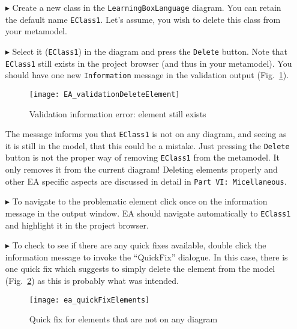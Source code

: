 \begin{enumerate}
\item[$\blacktriangleright$] Create a new class in the \texttt{Learning\-Box\-Language} diagram.
You can retain the default name \texttt{EClass1}.
Let's assume, you wish to delete this class from your metamodel.

\item[$\blacktriangleright$] Select it (\texttt{EClass1}) in the diagram and press the \texttt{Delete} button.
Note that \texttt{EClass1} still exists in the project browser (and thus in your metamodel). You should have one new \texttt{Information} message in the validation output (Fig.~\ref{fig:validation_information}).

\begin{figure}[htbp]
	\centering
  \texttt{[image: EA\_validationDeleteElement]}
	\caption{Validation information error: element still exists}
	\label{fig:validation_information}
\end{figure}

\pagebreak

The message informs you that \texttt{EClass1} is not on any diagram, and seeing as it is still in the model, that this could be a mistake.
Just pressing the \texttt{Delete} button is not the proper way of removing \texttt{EClass1} from the metamodel. It only removes it from the current diagram!
Deleting elements properly and other EA specific aspects are discussed in detail in \texttt{Part VI: Micellaneous}.


\item[$\blacktriangleright$] To navigate to the problematic element click once on the information message in the output window.
EA should navigate automatically to \texttt{EClass1} and highlight it in the project browser.

\item[$\blacktriangleright$] To check to see if there are any quick fixes available, double click the information message to invoke the ``QuickFix'' dialogue.
In this case, there is one quick fix which suggests to simply delete the element from the model (Fig.~\ref{fig:quick-fix1}) as this is probably what was intended.

\begin{figure}[htbp]
	\centering
  \texttt{[image: ea\_quickFixElements]}
	\caption{Quick fix for elements that are not on any diagram}
	\label{fig:quick-fix1}
\end{figure}
\FloatBarrier


\end{enumerate}
